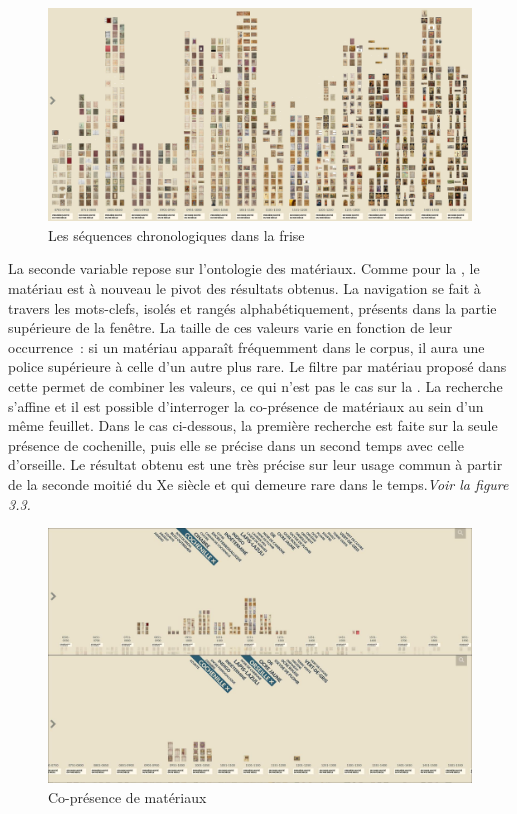 \begin{figure}[p]
	\centering
	\includegraphics[width=\textwidth]{./textes/chap3/vikus-chrono.jpg}
	\caption{Les séquences chronologiques dans la frise}
	\label{fig:info}
\end{figure}

La seconde variable repose sur l’ontologie des matériaux. Comme pour la , le matériau est à nouveau le pivot des résultats obtenus. La navigation se fait à travers les mots-clefs, isolés et rangés alphabétiquement, présents dans la partie supérieure de la fenêtre. La taille de ces valeurs varie en fonction de leur occurrence~: si un matériau apparaît fréquemment dans le corpus, il aura une police supérieure à celle d’un autre plus rare. Le filtre par matériau proposé dans cette  permet de combiner les valeurs, ce qui n’est pas le cas sur la . La recherche s’affine et il est possible d’interroger la co-présence de matériaux au sein d’un même feuillet. Dans le cas ci-dessous, la première recherche est faite sur la seule présence de cochenille, puis elle se précise dans un second temps avec celle d’orseille. Le résultat obtenu est une  très précise sur leur usage commun à partir de la seconde moitié du Xe siècle et qui demeure rare dans le temps.\textit{Voir la figure 3.3.}\par
\begin{figure}[p]
	\centering
	\includegraphics[width=\textwidth]{./textes/chap3/vikus-double.jpg}
	\caption{Co-présence de matériaux}
	\label{fig:info}
\end{figure}

